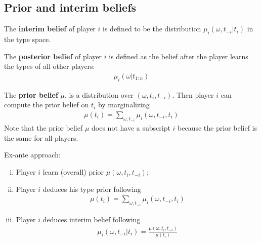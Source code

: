 \documentclass{article}
\begin{document}
   	\subsection{Prior and interim beliefs}
   	
   	\begin{definition}
   		The \textbf{interim belief} of player $i$ is defined to be the distribution $\mu_i(\omega, t_{-i}|t_i)$ in the type space.
   	\end{definition}
   	
   	\begin{definition}
   		The \textbf{posterior belief} of player $i$ is defined as the belief after the player learns the types of all other players:
   		\begin{align}
   			\mu_i(\omega|t_{1:n})
   		\end{align}
   	\end{definition}
   	
   	\begin{definition}
   		The \textbf{prior belief} $\mu$, is a distribution over $(\omega, t_i, t_{-i})$. Then player $i$ can compute the prior belief on $t_i$ by marginalizing
   		\begin{align}
   			\mu\left(t_{i}\right)=\sum_{\omega, t_{-i}} \mu_{i}\left(\omega, t_{-i}, t_{i}\right)
   		\end{align}
   		Note that the prior belief $\mu$ does not have a subscript $i$ because the prior belief is the same for all players.
   	\end{definition}
   	
   	\begin{remark}
	   	Ex-ante approach:
	   	\begin{enumerate}[(i)]
	   		\item Player $i$ learn (overall) prior $\mu\left(\omega, t_{i}, t_{-i}\right)$;
	   		\item Player $i$ deduces his type prior following
	   		\begin{align}
	   			\mu\left(t_{i}\right)=\sum_{\omega, t_{-i}} \mu_{i}\left(\omega, t_{-i}, t_{i}\right)
	   		\end{align}
	   		\item Player $i$ deduces interim belief following
	   		\begin{align}
	   			\mu_{i}\left(\omega, t_{-i} |t_i \right)
	   			=\frac{\mu\left(\omega, t_{i}, t_{-i}\right)}{\mu\left(t_{i}\right)}
	   		\end{align}
	   	\end{enumerate}
   	\end{remark}
   	
\end{document}
